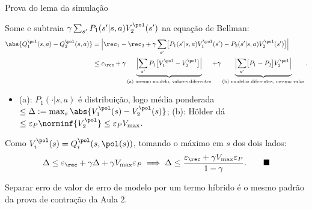 \documentclass[aspectratio=169, 11pt]{beamer}
\newcommand{\Vmax}{V_{\max}}
\begin{document}
\begin{frame}{Prova do lema da simulação}
  {\small
  Some e subtraia $\gamma\sum_{s'} P_1(s'|s,a) V_2^{\pol}(s')$ na equação de Bellman:
  \begin{align*}
    \abs{Q_1^{\pol}(s,a) - Q_2^{\pol}(s,a)}
    &= \Bigl| \rec_1 - \rec_2
       + \gamma \sum_{s'} \bigl[ P_1(s'|s,a) V_1^{\pol}(s') - P_2(s'|s,a) V_2^{\pol}(s') \bigr] \Bigr| \\[0.1em]
    &\le \varepsilon_{\rec}
       + \gamma \underbrace{\Bigl| \sum_{s'} P_1\bigl[V_1^{\pol} - V_2^{\pol}\bigr]\Bigr|}_{\text{(a) mesmo modelo, valores diferentes}}
       + \gamma \underbrace{\Bigl| \sum_{s'}\bigl[P_1 - P_2\bigr] V_2^{\pol}\Bigr|}_{\text{(b) modelos diferentes, mesmo valor}} .
  \end{align*}
  \vspace{-0.9em}
  \begin{itemize}
    \item (a): $P_1(\cdot|s,a)$ é distribuição, logo média ponderada
          $\le \Delta := \max_{s}\abs{V_1^{\pol}(s) - V_2^{\pol}(s)}$;
          \quad (b): Hölder dá $\le \varepsilon_P \norminf{V_2^{\pol}} \le \varepsilon_P \Vmax$.
  \end{itemize}
  Como $V^{\pol}_i(s) = Q^{\pol}_i(s,\pol(s))$, tomando o máximo em $s$ dos dois lados:
  \[
    \Delta \le \varepsilon_{\rec} + \gamma\Delta + \gamma \Vmax \varepsilon_P
    \;\Longrightarrow\;
    \Delta \le \frac{\varepsilon_{\rec} + \gamma\Vmax\varepsilon_P}{1-\gamma}. \qquad \blacksquare
  \]
  }
  \vspace{-0.7em}
  {\small\color{rlCinza} Separar erro de valor de erro de modelo por um termo híbrido é
  o mesmo padrão da prova de contração da Aula 2.}
\end{frame}
\end{document}

